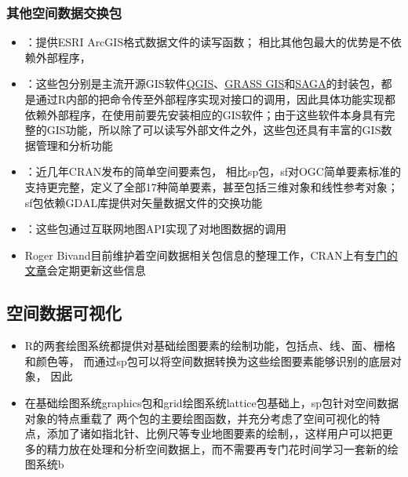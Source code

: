 \subsubsection{其他空间数据交换包}
\begin{frame}[t]{\subsecname}{\subsubsecname}
\begin{itemize} 
\item {}：提供ESRI ArcGIS格式数据文件的读写函数；
相比其他包最大的优势是不依赖外部程序，
\item {}：这些包分别是主流开源GIS软件\href{https://www.qgis.org/}{\uline{QGIS}}、\href{https://grass.osgeo.org/}{\uline{GRASS GIS}}和\href{http://www.saga-gis.org/}{\uline{SAGA}}的封装包，都是通过R内部的把命令传至外部程序实现对接口的调用，因此具体功能实现都依赖外部程序，在使用前要先安装相应的GIS软件；由于这些软件本身具有完整的GIS功能，所以除了可以读写外部文件之外，这些包还具有丰富的GIS数据管理和分析功能
\item {}：近几年CRAN发布的简单空间要素包，
相比sp包，sf对OGC简单要素标准的支持更完整，定义了全部17种简单要素，甚至包括三维对象和线性参考对象；sf包依赖GDAL库提供对矢量数据文件的交换功能
\item {}：这些包通过互联网地图API实现了对地图数据的调用
\item Roger Bivand目前维护着空间数据相关包信息的整理工作，CRAN上有\href{https://cran.r-project.org/web/views/Spatial.html}{\uline{专门的文章}}会定期更新这些信息
\end{itemize}
\end{frame}

\subsection{空间数据可视化}
\begin{frame}[t]{\subsecname}
\begin{itemize} 
\item<1-> R的两套绘图系统都提供对基础绘图要素的绘制功能，包括点、线、面、栅格和颜色等，
而通过sp包可以将空间数据转换为这些绘图要素能够识别的底层对象，
因此
\item<2-> 在基础绘图系统graphics包和grid绘图系统lattice包基础上，sp包针对空间数据对象的特点重载了
两个包的主要绘图函数，并充分考虑了空间可视化的特点，添加了诸如指北针、比例尺等专业地图要素的绘制，，这样用户可以把更多的精力放在处理和分析空间数据上，而不需要再专门花时间学习一套新的绘图系统b\end{itemize}
\end{frame}

